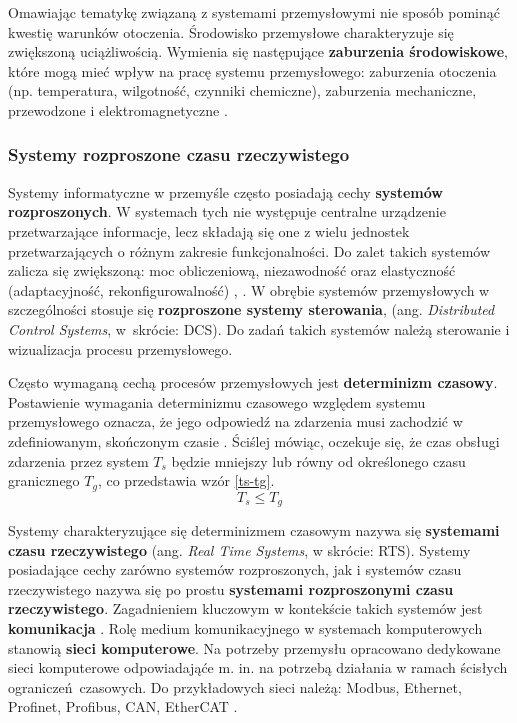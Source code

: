 \documentclass[a4paper, 12pt, twoside]{article}
\begin{document}
Omawiając tematykę związaną z systemami przemysłowymi nie sposób pominąć kwestię
warunków otoczenia. Środowisko przemysłowe charakteryzuje się zwiększoną uciążliwością.
Wymienia się następujące \textbf{zaburzenia środowiskowe}, które mogą mieć wpływ na pracę
systemu przemysłowego: zaburzenia otoczenia (np. temperatura, wilgotność, czynniki chemiczne),
zaburzenia mechaniczne, przewodzone i elektromagnetyczne \cite{isp}.

\subsubsection{Systemy rozproszone czasu rzeczywistego}

Systemy informatyczne w przemyśle często posiadają cechy \textbf{systemów rozproszonych}.
W systemach tych nie występuje centralne urządzenie
przetwarzające informacje, lecz składają się one z wielu jednostek
przetwarzających o różnym zakresie funkcjonalności. Do zalet
takich systemów zalicza się zwiększoną: moc obliczeniową, niezawodność oraz 
elastyczność (adaptacyjność, rekonfigurowalność)
\cite{isp},
\cite{isp-analiza-przepływu-informacji}. W obrębie systemów przemysłowych
w szczególności stosuje się \textbf{rozproszone systemy sterowania}, 
(ang. \emph{Distributed Control Systems}, w~skrócie: DCS). Do zadań takich systemów
należą sterowanie i wizualizacja procesu przemysłowego. 

Często wymaganą cechą procesów przemysłowych jest \textbf{determinizm czasowy}.
Postawienie wymagania determinizmu czasowego względem systemu przemysłowego oznacza,
że jego odpowiedź na zdarzenia musi zachodzić w zdefiniowanym, skończonym czasie
\cite{isp}.
Ściślej mówiąc, oczekuje się, że czas obsługi zdarzenia przez system $T_s$ będzie
mniejszy lub równy od określonego czasu granicznego $T_g$, co przedstawia 
wzór \ref{ts-tg}.
\begin{equation}
    T_s \leq T_g\label{ts-tg}
\end{equation}

Systemy charakteryzujące się determinizmem czasowym nazywa się 
\textbf{systemami czasu rzeczywistego} (ang. \emph{Real Time Systems}, w skrócie: RTS). 
Systemy posiadające cechy zarówno systemów rozproszonych, jak i systemów
czasu rzeczywistego nazywa się po prostu \textbf{systemami rozproszonymi czasu rzeczywistego}.
Zagadnieniem kluczowym w kontekście takich systemów
jest \textbf{komunikacja} \cite{isp-analiza-przepływu-informacji}.
Rolę medium komunikacyjnego
w systemach komputerowych stanowią \textbf{sieci komputerowe}. Na potrzeby 
przemysłu opracowano dedykowane sieci komputerowe odpowiadająće m. in. na potrzebą
działania w ramach ścisłych ograniczeń czasowych. Do przykładowych sieci należą:
Modbus, Ethernet, Profinet, Profibus, CAN, EtherCAT \cite{systemy-automatyki-przemyslowej}.
\end{document}
